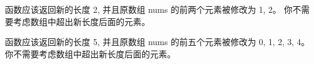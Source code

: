 函数应该返回新的长度 2, 并且原数组 nums 的前两个元素被修改为 1, 2。 
你不需要考虑数组中超出新长度后面的元素。

函数应该返回新的长度 5, 并且原数组 nums 的前五个元素被修改为 0, 1, 2, 3, 4。
你不需要考虑数组中超出新长度后面的元素。
